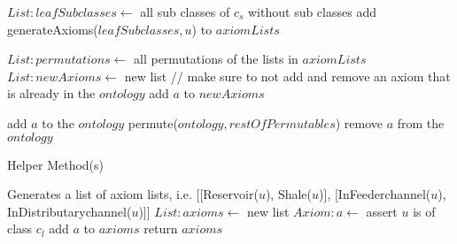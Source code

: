 \documentclass{article}
\begin{document}
\begin{algorithm}
\begin{algorithmic}[0]
		\State $List:leafSubclasses \leftarrow$ all sub classes of $c_s$ without sub classes
		\State  add generateAxioms($leafSubclasses, u$) to $axiomLists$
	\EndFor

	\State	
	\State $List:permutations \leftarrow$ all permutations of the lists in $axiomLists$
	\State
		\State $List:newAxioms \leftarrow$ new list
		\State
		\State // make sure to not add and remove an axiom that is already in the $ontology$
				\State add $a$ to $newAxioms$
						
			\EndIf
		\EndFor
		\State
			\State add $a$ to the $ontology$
		\EndFor
		\State
		\State permute($ontology, restOfPermutables$)
		\State
			\State remove $a$ from the $ontology$
		\EndFor
	\EndFor
	
\EndProcedure
\end{algorithmic}
\end{algorithm}




\begin{algorithm}
\caption{Helper Method(s)}
\begin{algorithmic}
\State Generates a list of axiom lists, i.e. [[Reservoir($u$), Shale($u$)], [InFeederchannel($u$), InDistributarychannel($u$)]]
\State $List:axioms \leftarrow$ new list
\State
{}
	\State $Axiom:a \leftarrow$ assert $u$ is of class $c_l$
	\State add $a$ to $axioms$
\EndFor
\State
\State return $axioms$
\EndProcedure



\end{algorithmic}
\end{algorithm}
\end{document}
